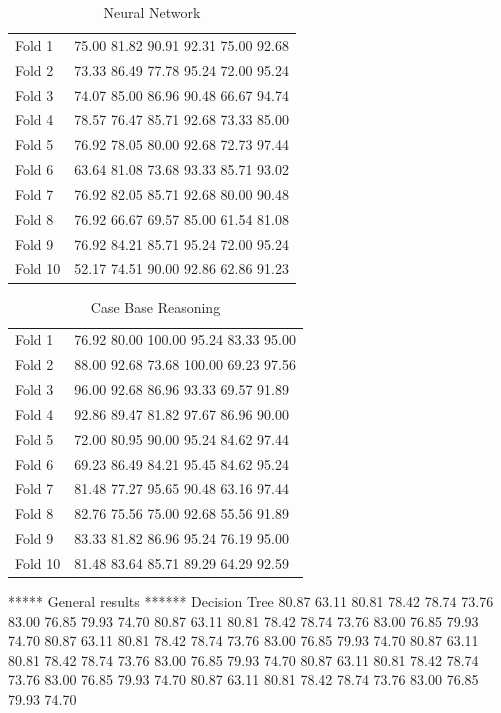 \documentclass[a4paper,12pt,oneside,final]{report}
\begin{document}
\begin{enumerate}
\begin{table} [H]
\begin{tabular}{ll}
Fold 1 &  75.00  81.82  90.91  92.31  75.00  92.68    \\ 
Fold 2 &  73.33  86.49  77.78  95.24  72.00  95.24    \\ 
Fold 3 &  74.07  85.00  86.96  90.48  66.67  94.74   \\ 
Fold 4 &  78.57  76.47  85.71  92.68  73.33  85.00   \\ 
Fold 5 &  76.92  78.05  80.00  92.68  72.73  97.44   \\ 
Fold 6 &  63.64  81.08  73.68  93.33  85.71  93.02   \\ 
Fold 7 &  76.92  82.05  85.71  92.68  80.00  90.48   \\ 
Fold 8 &  76.92  66.67  69.57  85.00  61.54  81.08  \\ 
Fold 9 &  76.92  84.21  85.71  95.24  72.00  95.24   \\ 
Fold 10 &  52.17  74.51  90.00  92.86  62.86  91.23   \\ 
\end{tabular}
\caption{ Neural Network}
\end{table}


\begin{table} [H]
\begin{tabular}{ll}
Fold 1 &  76.92  80.00  100.00  95.24  83.33  95.00   \\ 
Fold 2 &  88.00  92.68  73.68  100.00  69.23  97.56   \\ 
Fold 3 &  96.00  92.68  86.96  93.33  69.57  91.89   \\ 
Fold 4 &  92.86  89.47  81.82  97.67  86.96  90.00   \\ 
Fold 5 &  72.00  80.95  90.00  95.24  84.62  97.44   \\ 
Fold 6 &  69.23  86.49  84.21  95.45  84.62  95.24   \\ 
Fold 7 &  81.48  77.27  95.65  90.48  63.16  97.44   \\ 
Fold 8 & 82.76  75.56  75.00  92.68  55.56  91.89   \\ 
Fold 9 &  83.33  81.82  86.96  95.24  76.19  95.00   \\ 
Fold 10 &  81.48  83.64  85.71  89.29  64.29  92.59   \\ 
\end{tabular}
\caption{ Case Base Reasoning}
\end{table}


***** General results ******
Decision Tree
80.87 63.11 80.81 78.42 78.74 73.76 83.00 76.85 79.93 74.70 
80.87 63.11 80.81 78.42 78.74 73.76 83.00 76.85 79.93 74.70 
80.87 63.11 80.81 78.42 78.74 73.76 83.00 76.85 79.93 74.70 
80.87 63.11 80.81 78.42 78.74 73.76 83.00 76.85 79.93 74.70 
80.87 63.11 80.81 78.42 78.74 73.76 83.00 76.85 79.93 74.70 
80.87 63.11 80.81 78.42 78.74 73.76 83.00 76.85 79.93 74.70 


\end{enumerate}
\end{document}
